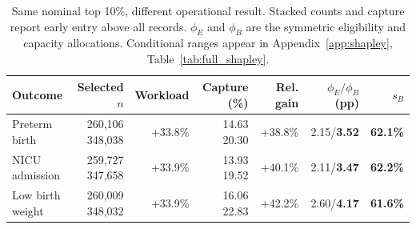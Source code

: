 \begin{table}[!htbp]
\centering
\caption{Same nominal top 10\%, different operational result. Stacked counts and capture report early entry above all records. $\phi_E$ and $\phi_B$ are the symmetric eligibility and capacity allocations. Conditional ranges appear in Appendix~\ref{app:shapley}, Table~\ref{tab:full_shapley}.}
\label{tab:main_results}
\small
\setlength{\tabcolsep}{2.5pt}
\begin{tabular*}{\linewidth}{@{\extracolsep{\fill}}lrrrrrr@{}}
\toprule
Outcome & Selected $n$ & Workload & Capture (\%) & Rel. gain & $\phi_E/\phi_B$ (pp) & $s_B$ \\
\midrule
Preterm birth & \shortstack[r]{260,106\\348,038} & +33.8\% & \shortstack[r]{14.63\\20.30} & +38.8\% & 2.15/\textbf{3.52} & \textbf{62.1\%} \\
\addlinespace[3pt]
NICU admission & \shortstack[r]{259,727\\347,658} & +33.9\% & \shortstack[r]{13.93\\19.52} & +40.1\% & 2.11/\textbf{3.47} & \textbf{62.2\%} \\
\addlinespace[3pt]
Low birth weight & \shortstack[r]{260,009\\348,032} & +33.9\% & \shortstack[r]{16.06\\22.83} & +42.2\% & 2.60/\textbf{4.17} & \textbf{61.6\%} \\
\bottomrule
\end{tabular*}
\end{table}
